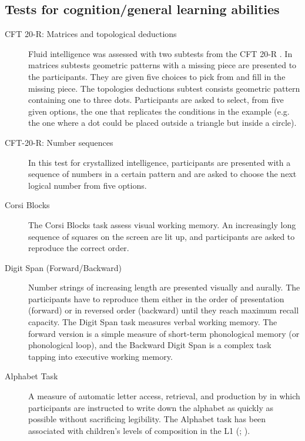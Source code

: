 \documentclass[output=paper]{langsci/langscibook}
\begin{document}
\subsection{Tests for cognition/general learning abilities}
\begin{description}
\item[CFT 20-R: Matrices and topological deductions \citep{Weiss2006}] Fluid intelligence was assessed with two subtests from the CFT 20-R \citep{Weiss2006}. In matrices subtests geometric patterns with a missing piece are presented to the participants. They are given five choices to pick from and fill in the missing piece. The topologies deductions subtest consists geometric pattern containing one to three dots. Participants are asked to select, from five given options, the one that replicates the conditions in the example (e.g. the one where a dot could be placed outside a triangle but inside a circle).

\item[CFT-20-R: Number sequences \citep{Weiss2006}] In this test for crystallized intelligence, participants are presented with a sequence of numbers in a certain pattern and are asked to choose the next logical number from five options.

\item[Corsi Blocks] The Corsi Blocks task assess visual working memory. An increasingly long sequence of squares on the screen are lit up, and participants are asked to reproduce the correct order.

\item[Digit Span (Forward/Backward)] Number strings of increasing length are presented visually and aurally. The participants have to reproduce them either in the order of presentation (forward) or in reversed order (backward) until they reach maximum recall capacity. The Digit Span task measures verbal working memory. The forward version is a simple measure of short-term phonological memory (or phonological loop), and the Backward Digit Span is a complex task tapping into executive working memory.

\item[Alphabet Task] A measure of automatic letter access, retrieval, and production by \citet{BerningerEtAl1992} in which participants are instructed to write down the alphabet as quickly as possible without sacrificing legibility. The Alphabet task has been associated with children’s levels of composition in the L1 (\citealt{BerningerEtAl1997}; \citealt{GrahamEtAl2006}).


\end{description}
\end{document}
